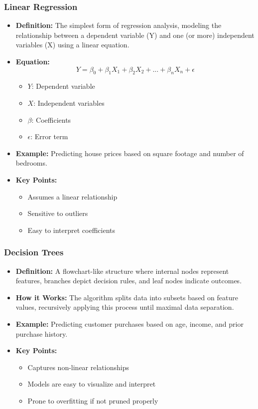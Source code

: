 \documentclass[aspectratio=169]{beamer}
\begin{document}
\begin{frame}[fragile]
    \frametitle{Linear Regression}
    \begin{itemize}
        \item \textbf{Definition:} The simplest form of regression analysis, modeling the relationship between a dependent variable (Y) and one (or more) independent variables (X) using a linear equation.
        \item \textbf{Equation:}
        \begin{equation}
            Y = \beta_0 + \beta_1X_1 + \beta_2X_2 + ... + \beta_nX_n + \epsilon
        \end{equation}
        \begin{itemize}
            \item $Y$: Dependent variable
            \item $X$: Independent variables
            \item $\beta$: Coefficients
            \item $\epsilon$: Error term
        \end{itemize}
        \item \textbf{Example:} Predicting house prices based on square footage and number of bedrooms.
        \item \textbf{Key Points:}
        \begin{itemize}
            \item Assumes a linear relationship
            \item Sensitive to outliers
            \item Easy to interpret coefficients
        \end{itemize}
    \end{itemize}
\end{frame}

\begin{frame}[fragile]
    \frametitle{Decision Trees}
    \begin{itemize}
        \item \textbf{Definition:} A flowchart-like structure where internal nodes represent features, branches depict decision rules, and leaf nodes indicate outcomes.
        \item \textbf{How it Works:} The algorithm splits data into subsets based on feature values, recursively applying this process until maximal data separation.
        \item \textbf{Example:} Predicting customer purchases based on age, income, and prior purchase history.
        \item \textbf{Key Points:}
        \begin{itemize}
            \item Captures non-linear relationships
            \item Models are easy to visualize and interpret
            \item Prone to overfitting if not pruned properly
        \end{itemize}
    \end{itemize}
\end{frame}
\end{document}
